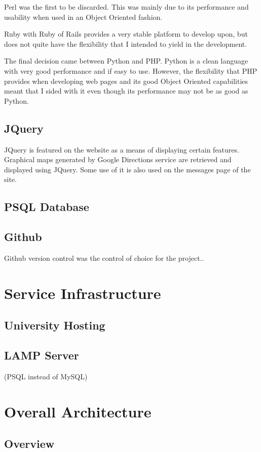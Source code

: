 		Perl was the first to be discarded. This was mainly due to its performance and usability when used in an Object Oriented fashion. 
		
		Ruby with Ruby of Rails provides a very stable platform to develop upon, but does not quite have the flexibility that I intended to yield in the development. 
		
		The final decision came between Python and PHP. Python is a clean language with very good performance and if easy to use. However, the flexibility that PHP provides when developing web pages and its good Object Oriented capabilities meant that I sided with it even though its performance may not be as good as Python.
		
	\subsection{JQuery}
		JQuery is featured on the website as a means of displaying certain features. Graphical maps generated by Google Directions \cite{google_directions_api} service are retrieved and displayed using JQuery. Some use of it is also used on the messages page of the site.		
	\subsection{PSQL Database}
	
	\subsection{Github}
		Github \cite{github} version control was the control of choice for the project..
\section{Service Infrastructure}
	\subsection{University Hosting}
	\subsection{LAMP Server}
		(PSQL instead of MySQL)
\section{Overall Architecture}
	\subsection{Overview}
